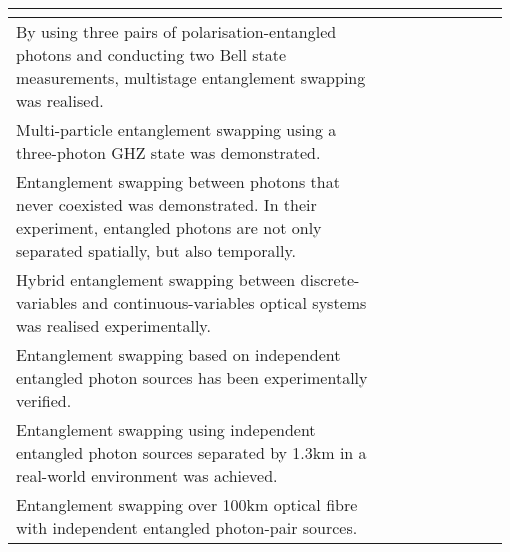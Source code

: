 \begin{table*}[!htbp]
\begin{tabular}{|p{0.755\linewidth}|p{0.22\linewidth}|}
		&\cite{bib:Nat_Phys_8_479}\\
		\hline 
		By using three pairs of polarisation-entangled photons and conducting two Bell state measurements, multistage entanglement swapping was realised.&\cite{bib:goebel08}\\
		\hline 
		Multi-particle entanglement swapping using a three-photon GHZ state was demonstrated.&\cite{bib:PRL_103_020501}\\
		\hline
		Entanglement swapping between photons that never coexisted was demonstrated. In their experiment, entangled photons are not only separated spatially, but also temporally.&\cite{bib:PRL_110_210403}\\
		\hline
		Hybrid entanglement swapping between discrete-variables and continuous-variables optical systems was realised experimentally.&\cite{bib:takeda2015entanglement}\\
		\hline
		Entanglement swapping based on independent entangled photon sources has been experimentally verified.
		& \cite{bib:PRL_96_110501, bib:Nat_Phys_3_692, bib:PRA_79_040302}\\
		\hline
		Entanglement swapping using independent entangled photon sources separated by 1.3km in a real-world environment was achieved. &\cite{bib:hensen2015loophole}\\
		\hline
		 Entanglement swapping over 100km optical fibre with independent entangled photon-pair sources.&\cite{bib:sun2017entanglement}\\

\end{tabular}
\end{table*}
